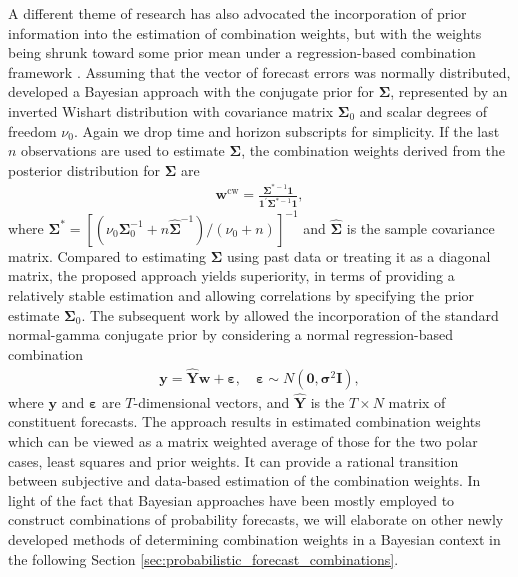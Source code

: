 \documentclass[11pt]{article}
\begin{document}
A different theme of research has also advocated the incorporation of prior information into the estimation of combination weights, but with the weights being shrunk toward some prior mean under a regression-based combination framework \citep{Newbold2002-wa}. Assuming that the vector of forecast errors was normally distributed, \cite{Clemen1986-pd} developed a Bayesian approach with the conjugate prior for $\boldsymbol{\Sigma}$, represented by an inverted Wishart distribution with covariance matrix $\boldsymbol{\Sigma}_{0}$ and scalar degrees of freedom $\nu_{0}$. Again we drop time and horizon subscripts for simplicity. If the last $n$ observations are used to estimate $\boldsymbol{\Sigma}$, the combination weights derived from the posterior distribution for $\boldsymbol{\Sigma}$ are
\begin{align}
\label{eq:weight_cw}
\boldsymbol{w}^{\text{cw}}=\frac{\boldsymbol{\Sigma}^{*-1}\mathbf{1}}{\mathbf{1}^{\prime} \boldsymbol{\Sigma}^{*-1} \mathbf{1}},
\end{align}
where $\boldsymbol{\Sigma}^{*}=\left[\left(\nu_{0} \boldsymbol{\Sigma}_{0}^{-1}+n \hat{\boldsymbol{\Sigma}}^{-1}\right) /(\nu_{0}+n)\right]^{-1}$ and $\hat{\boldsymbol{\Sigma}}$ is the sample covariance matrix.
Compared to estimating $\boldsymbol{\Sigma}$ using past data or treating it as a diagonal matrix, the proposed approach yields superiority, in terms of providing a relatively stable estimation and allowing correlations by specifying the prior estimate $\boldsymbol{\Sigma}_{0}$. The subsequent work by \cite{Diebold1990-fk} allowed the incorporation of the standard normal-gamma conjugate prior by considering a normal regression-based combination
\begin{align}
\label{eq:weight_dp}
\mathbf{y}=\hat{\mathbf{Y}} \boldsymbol{w}+\boldsymbol{\varepsilon}, \quad \boldsymbol{\varepsilon} \sim N\left(\mathbf{0}, \boldsymbol{\sigma}^{2} \mathbf{I}\right),
\end{align}
where $\mathbf{y}$ and $\boldsymbol{\varepsilon}$ are $T$-dimensional vectors, and $\hat{\mathbf{Y}}$ is the $T \times N$ matrix of constituent forecasts. The approach results in estimated combination weights which can be viewed as a matrix weighted average of those for the two polar cases, least squares and prior weights. It can provide a rational transition between subjective and data-based estimation of the combination weights. In light of the fact that Bayesian approaches have been mostly employed to construct combinations of probability forecasts, we will elaborate on other newly developed methods of determining combination weights in a Bayesian context in the following Section \ref{sec:probabilistic_forecast_combinations}.
\end{document}
